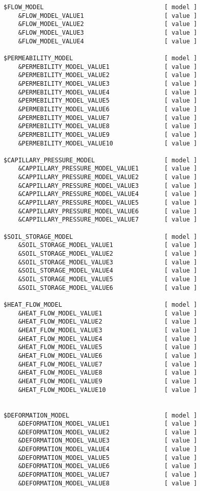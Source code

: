 \begin{verbatim}
$FLOW_MODEL                                 [ model ]
    &FLOW_MODEL_VALUE1                      [ value ]
    &FLOW_MODEL_VALUE2                      [ value ]
    &FLOW_MODEL_VALUE3                      [ value ]
    &FLOW_MODEL_VALUE4                      [ value ]

$PERMEABILITY_MODEL                         [ model ]
    &PERMEBILITY_MODEL_VALUE1               [ value ]
    &PERMEBILITY_MODEL_VALUE2               [ value ]
    &PERMEBILITY_MODEL_VALUE3               [ value ]
    &PERMEBILITY_MODEL_VALUE4               [ value ]
    &PERMEBILITY_MODEL_VALUE5               [ value ]
    &PERMEBILITY_MODEL_VALUE6               [ value ]
    &PERMEBILITY_MODEL_VALUE7               [ value ]
    &PERMEBILITY_MODEL_VALUE8               [ value ]
    &PERMEBILITY_MODEL_VALUE9               [ value ]
    &PERMEBILITY_MODEL_VALUE10              [ value ]

$CAPILLARY_PRESSURE_MODEL                   [ model ]
    &CAPPILLARY_PRESSURE_MODEL_VALUE1       [ value ]
    &CAPPILLARY_PRESSURE_MODEL_VALUE2       [ value ]
    &CAPPILLARY_PRESSURE_MODEL_VALUE3       [ value ]
    &CAPPILLARY_PRESSURE_MODEL_VALUE4       [ value ]
    &CAPPILLARY_PRESSURE_MODEL_VALUE5       [ value ]
    &CAPPILLARY_PRESSURE_MODEL_VALUE6       [ value ]
    &CAPPILLARY_PRESSURE_MODEL_VALUE7       [ value ]

$SOIL_STORAGE_MODEL                         [ model ]
    &SOIL_STORAGE_MODEL_VALUE1              [ value ]
    &SOIL_STORAGE_MODEL_VALUE2              [ value ]
    &SOIL_STORAGE_MODEL_VALUE3              [ value ]
    &SOIL_STORAGE_MODEL_VALUE4              [ value ]
    &SOIL_STORAGE_MODEL_VALUE5              [ value ]
    &SOIL_STORAGE_MODEL_VALUE6              [ value ]

$HEAT_FLOW_MODEL                            [ model ]
    &HEAT_FLOW_MODEL_VALUE1                 [ value ]
    &HEAT_FLOW_MODEL_VALUE2                 [ value ]
    &HEAT_FLOW_MODEL_VALUE3                 [ value ]
    &HEAT_FLOW_MODEL_VALUE4                 [ value ]
    &HEAT_FLOW_MODEL_VALUE5                 [ value ]
    &HEAT_FLOW_MODEL_VALUE6                 [ value ]
    &HEAT_FLOW_MODEL_VALUE7                 [ value ]
    &HEAT_FLOW_MODEL_VALUE8                 [ value ]
    &HEAT_FLOW_MODEL_VALUE9                 [ value ]
    &HEAT_FLOW_MODEL_VALUE10                [ value ]


$DEFORMATION_MODEL                          [ model ]
    &DEFORMATION_MODEL_VALUE1               [ value ]
    &DEFORMATION_MODEL_VALUE2               [ value ]
    &DEFORMATION_MODEL_VALUE3               [ value ]
    &DEFORMATION_MODEL_VALUE4               [ value ]
    &DEFORMATION_MODEL_VALUE5               [ value ]
    &DEFORMATION_MODEL_VALUE6               [ value ]
    &DEFORMATION_MODEL_VALUE7               [ value ]
    &DEFORMATION_MODEL_VALUE8               [ value ]




\end{verbatim}
